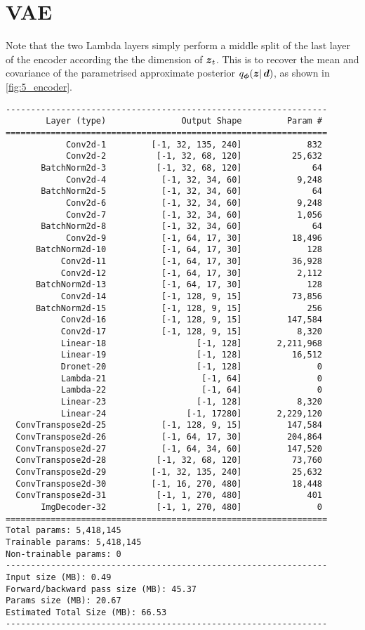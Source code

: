 \section{VAE}
Note that the two Lambda layers simply perform a middle split of the last layer of the encoder according the the dimension of ${\boldsymbol{z}}_t$. This is to recover the mean and covariance of the parametrised approximate posterior $q_{\boldsymbol{\phi}}(\boldsymbol{z} |\, {\boldsymbol{d}})$, as shown in \cref{fig:5_encoder}.
\begin{verbatim}
----------------------------------------------------------------
        Layer (type)               Output Shape         Param #
================================================================
            Conv2d-1         [-1, 32, 135, 240]             832
            Conv2d-2          [-1, 32, 68, 120]          25,632
       BatchNorm2d-3          [-1, 32, 68, 120]              64
            Conv2d-4           [-1, 32, 34, 60]           9,248
       BatchNorm2d-5           [-1, 32, 34, 60]              64
            Conv2d-6           [-1, 32, 34, 60]           9,248
            Conv2d-7           [-1, 32, 34, 60]           1,056
       BatchNorm2d-8           [-1, 32, 34, 60]              64
            Conv2d-9           [-1, 64, 17, 30]          18,496
      BatchNorm2d-10           [-1, 64, 17, 30]             128
           Conv2d-11           [-1, 64, 17, 30]          36,928
           Conv2d-12           [-1, 64, 17, 30]           2,112
      BatchNorm2d-13           [-1, 64, 17, 30]             128
           Conv2d-14           [-1, 128, 9, 15]          73,856
      BatchNorm2d-15           [-1, 128, 9, 15]             256
           Conv2d-16           [-1, 128, 9, 15]         147,584
           Conv2d-17           [-1, 128, 9, 15]           8,320
           Linear-18                  [-1, 128]       2,211,968
           Linear-19                  [-1, 128]          16,512
           Dronet-20                  [-1, 128]               0
           Lambda-21                   [-1, 64]               0
           Lambda-22                   [-1, 64]               0
           Linear-23                  [-1, 128]           8,320
           Linear-24                [-1, 17280]       2,229,120
  ConvTranspose2d-25           [-1, 128, 9, 15]         147,584
  ConvTranspose2d-26           [-1, 64, 17, 30]         204,864
  ConvTranspose2d-27           [-1, 64, 34, 60]         147,520
  ConvTranspose2d-28          [-1, 32, 68, 120]          73,760
  ConvTranspose2d-29         [-1, 32, 135, 240]          25,632
  ConvTranspose2d-30         [-1, 16, 270, 480]          18,448
  ConvTranspose2d-31          [-1, 1, 270, 480]             401
       ImgDecoder-32          [-1, 1, 270, 480]               0
================================================================
Total params: 5,418,145
Trainable params: 5,418,145
Non-trainable params: 0
----------------------------------------------------------------
Input size (MB): 0.49
Forward/backward pass size (MB): 45.37
Params size (MB): 20.67
Estimated Total Size (MB): 66.53
----------------------------------------------------------------
\end{verbatim}

